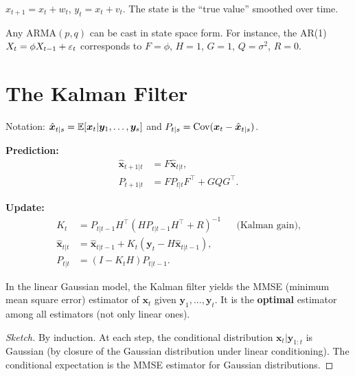 \begin{example}
$x_{t+1}=x_t+w_t$, $y_t=x_t+v_t$. The state is the ``true value'' smoothed over time.
\end{example}

\begin{example}
Any ARMA$(p,q)$ can be cast in state space form. For instance, the AR(1) $X_t=\phi X_{t-1}+\varepsilon_t$ corresponds to $F=\phi$, $H=1$, $G=1$, $Q=\sigma^2$, $R=0$.
\end{example}

\section{The Kalman Filter}

\begin{definition}
Notation: $\hat{\bm{x}}_{t|s}=\mathbb{E}[\bm{x}_t|\bm{y}_1,\ldots,\bm{y}_s]$ and $P_{t|s}=\operatorname{Cov}(\bm{x}_t-\hat{\bm{x}}_{t|s})$.

\medskip
\textbf{Prediction:}
\begin{align}
\hat{\bm{x}}_{t+1|t} &= F\hat{\bm{x}}_{t|t}, \\
P_{t+1|t} &= FP_{t|t}F^\top + GQG^\top.
\end{align}

\textbf{Update:}
\begin{align}
K_t &= P_{t|t-1}H^\top(HP_{t|t-1}H^\top+R)^{-1} && \text{(Kalman gain)},\\
\hat{\bm{x}}_{t|t} &= \hat{\bm{x}}_{t|t-1} + K_t(\bm{y}_t - H\hat{\bm{x}}_{t|t-1}), \\
P_{t|t} &= (I-K_tH)P_{t|t-1}.
\end{align}
\end{definition}

\begin{theorem}
In the linear Gaussian model, the Kalman filter yields the MMSE (minimum mean square error) estimator of $\bm{x}_t$ given $\bm{y}_1,\ldots,\bm{y}_t$. It is the \textbf{optimal} estimator among all estimators (not only linear ones).
\end{theorem}

\begin{proof}[Sketch]
By induction. At each step, the conditional distribution $\bm{x}_t|\bm{y}_{1:t}$ is Gaussian (by closure of the Gaussian distribution under linear conditioning). The conditional expectation is the MMSE estimator for Gaussian distributions.
\end{proof}

